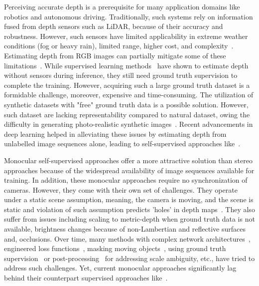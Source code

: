 \documentclass{bmvc2k}
\begin{document}
Perceiving accurate depth is a prerequisite for many application domains like robotics and autonomous driving. Traditionally, such systems rely on information fused from depth sensors such as LiDAR, because of their accuracy and robustness. However, such sensors have limited applicability in extreme weather conditions (fog or heavy rain), limited range, higher cost, and complexity~\cite{dudek2010computational, johnston2020self}. Estimating depth from RGB images can partially mitigate some of these limitations~\cite{godard2019digging}. While supervised learning methods~\cite{eigen, eigen2015predicting, wang2015designing, fu2018deep, guo2018learning} have shown to estimate depth without sensors during inference, they still need ground truth supervision to complete the training. However, acquiring such a large ground truth dataset is a formidable challenge, moreover, expensive and time-consuming. The utilization of synthetic datasets with "free" ground truth data is a possible solution. However, such dataset are lacking representability compared to natural dataset, owing the difficulty in generating photo-realistic synthetic images~\cite{lopez2020desc}. Recent advancements in deep learning helped in alleviating these issues by estimating depth from unlabelled image sequences alone, leading to self-supervised approaches like~\cite{zhou2017unsupervised, godard2017unsupervised, yin2018geonet, godard2019digging}. 

Monocular self-supervised approaches offer a more attractive solution than stereo approaches because of the widespread availability of image sequences available for training. In addition, these monocular approaches require no synchronization of cameras. However, they come with their own set of challenges. They operate under a static scene assumption, meaning, the camera is moving, and the scene is static and violation of such assumption predicts 'holes' in depth maps~\cite{godard2019digging}. They also suffer from issues including scaling to metric-depth when ground truth data is not available, brightness changes because of non-Lambertian and reflective surfaces and, occlusions. Over time, many methods with complex network architectures~\cite{zhou2017unsupervised, guizilini20203d}, engineered loss functions~\cite{godard2019digging,shu2020feature}, masking moving objects~\cite{zhou2017unsupervised,luo2018single, godard2019digging}, using ground truth supervision~\cite{guizilini20203d} or post-processing~\cite{mccraith2020calibrating,xue2020toward} for addressing scale ambiguity, etc., have tried to address such challenges. Yet, current monocular approaches significantly lag behind their counterpart supervised approaches like~\cite{fu2018deep,alhashim2018high, andraghetti2019enhancing}.
\end{document}
